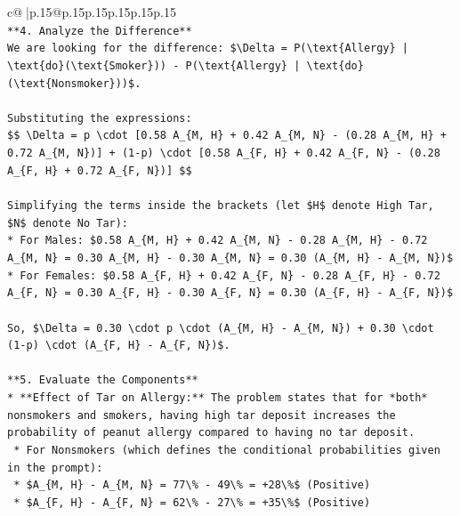 \documentclass{article}
\begin{document}
{\begin{supertabular}{c@{$\;$}|p{.15\linewidth}@{}p{.15\linewidth}p{.15\linewidth}p{.15\linewidth}p{.15\linewidth}p{.15\linewidth}}
{{{\\ 
\texttt{**4. Analyze the Difference**} \\
\texttt{We are looking for the difference: \$\textbackslash{}Delta = P(\textbackslash{}text\{Allergy\} | \textbackslash{}text\{do\}(\textbackslash{}text\{Smoker\})) {-} P(\textbackslash{}text\{Allergy\} | \textbackslash{}text\{do\}(\textbackslash{}text\{Nonsmoker\}))\$.} \\
\\ 
\texttt{Substituting the expressions:} \\
\texttt{\$\$ \textbackslash{}Delta = p \textbackslash{}cdot {[}0.58 A\_\{M, H\} + 0.42 A\_\{M, N\} {-} (0.28 A\_\{M, H\} + 0.72 A\_\{M, N\}){]} + (1{-}p) \textbackslash{}cdot {[}0.58 A\_\{F, H\} + 0.42 A\_\{F, N\} {-} (0.28 A\_\{F, H\} + 0.72 A\_\{F, N\}){]} \$\$} \\
\\ 
\texttt{Simplifying the terms inside the brackets (let \$H\$ denote High Tar, \$N\$ denote No Tar):} \\
\texttt{*   For Males: \$0.58 A\_\{M, H\} + 0.42 A\_\{M, N\} {-} 0.28 A\_\{M, H\} {-} 0.72 A\_\{M, N\} = 0.30 A\_\{M, H\} {-} 0.30 A\_\{M, N\} = 0.30 (A\_\{M, H\} {-} A\_\{M, N\})\$} \\
\texttt{*   For Females: \$0.58 A\_\{F, H\} + 0.42 A\_\{F, N\} {-} 0.28 A\_\{F, H\} {-} 0.72 A\_\{F, N\} = 0.30 A\_\{F, H\} {-} 0.30 A\_\{F, N\} = 0.30 (A\_\{F, H\} {-} A\_\{F, N\})\$} \\
\\ 
\texttt{So, \$\textbackslash{}Delta = 0.30 \textbackslash{}cdot p \textbackslash{}cdot (A\_\{M, H\} {-} A\_\{M, N\}) + 0.30 \textbackslash{}cdot (1{-}p) \textbackslash{}cdot (A\_\{F, H\} {-} A\_\{F, N\})\$.} \\
\\ 
\texttt{**5. Evaluate the Components**} \\
\texttt{*   **Effect of Tar on Allergy:** The problem states that for *both* nonsmokers and smokers, having high tar deposit increases the probability of peanut allergy compared to having no tar deposit.} \\
\texttt{    *   For Nonsmokers (which defines the conditional probabilities given in the prompt):} \\
\texttt{        *   \$A\_\{M, H\} {-} A\_\{M, N\} = 77\textbackslash{}\% {-} 49\textbackslash{}\% = +28\textbackslash{}\%\$ (Positive)} \\
\texttt{        *   \$A\_\{F, H\} {-} A\_\{F, N\} = 62\textbackslash{}\% {-} 27\textbackslash{}\% = +35\textbackslash{}\%\$ (Positive)} \\
}}}
\end{supertabular}}
\end{document}
